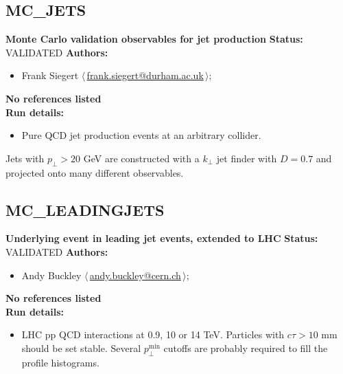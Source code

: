 \clearpage


\clearpage

\subsection{MC\_JETS}
\textbf{Monte Carlo validation observables for jet production}\newline
\textbf{Status:} VALIDATED\newline
\textbf{Authors:}
\begin{itemize}
  \item Frank Siegert $\langle\,$\href{mailto:frank.siegert@durham.ac.uk}{frank.siegert@durham.ac.uk}$\,\rangle$;
\end{itemize}
\textbf{No references listed}\\ 
\textbf{Run details:}
\begin{itemize}

  \item Pure QCD jet production events at an arbitrary collider.\end{itemize}

\noindent Jets with $p_\perp>20$ GeV are constructed with a $k_\perp$ jet finder with $D=0.7$ and projected onto many different observables.

\clearpage


\clearpage

\subsection{MC\_LEADINGJETS}
\textbf{Underlying event in leading jet events, extended to LHC}\newline
\textbf{Status:} VALIDATED\newline
\textbf{Authors:}
\begin{itemize}
  \item Andy Buckley $\langle\,$\href{mailto:andy.buckley@cern.ch}{andy.buckley@cern.ch}$\,\rangle$;
\end{itemize}
\textbf{No references listed}\\ 
\textbf{Run details:}
\begin{itemize}

  \item LHC pp QCD interactions at 0.9, 10 or 14 TeV. Particles with  $c \tau > 10$ mm should be set stable. Several $p_\perp^\text{min}$  cutoffs are probably required to fill the profile histograms.\end{itemize}

